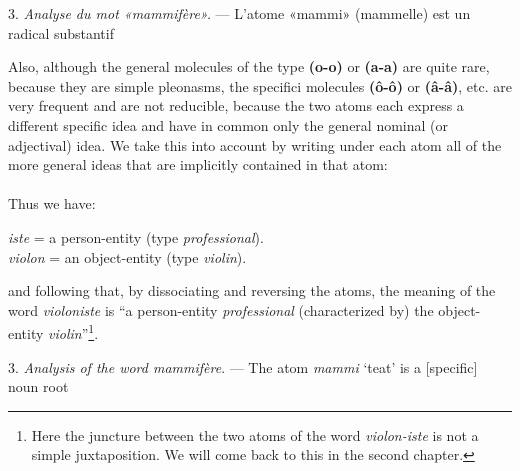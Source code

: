 \begin{sloppypar}
{  3. \emph{Analyse du mot «mammifère».} — L’atome «mammi» (mammelle)
  est un radical substantif

}
%
{Also, although the general molecules of the type \textbf{(o-o)} or
  \textbf{(a-a)} are quite rare, because they are simple pleonasms,
  the specifici molecules \textbf{(ô-ô)} or \textbf{(â-â)}, etc. are
  very frequent and are not reducible, because the two atoms each
  express a different specific idea and have in common only the
  general nominal (or adjectival) idea. We take this into account by
  writing under each atom all of the more general ideas that are
  implicitly
  contained in that atom:\\[1ex]

  \noindent
  {\setlength{\tabcolsep}{0pt}
    }
  \\[1ex]

  Thus we have:

  \begin{center}
    {\small
      \emph{iste} = a person-entity (type \emph{professional}).\\
      \emph{violon} = an object-entity (type \emph{violin}).}
  \end{center}

  \noindent
  and following that, by dissociating and reversing the atoms, the
  meaning of the word \emph{violoniste} is ``a person-entity
  \emph{professional} (characterized by) the object-entity
  \emph{violin}''\footnote{Here the juncture between the two atoms of
    the word \emph{violon-iste} is not a simple juxtaposition.  We will
    come back to this in the second chapter.}.

  3. \emph{Analysis of the word \emph{mammifère}}. --- The atom
  \emph{mammi} `teat' is a [specific] noun root

}

\end{sloppypar}

